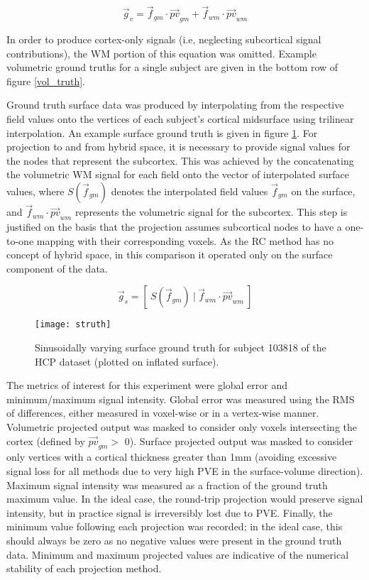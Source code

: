 \begin{equation}
\vec{g}_v = \vec{f}_{gm} \cdot \vec{pv}_{gm} + \vec{f}_{wm} \cdot \vec{pv}_{wm}
\end{equation}

In order to produce cortex-only signals (i.e, neglecting subcortical signal contributions), the WM portion of this equation was omitted. Example volumetric ground truths for a single subject are given in the bottom row of figure \ref{vol_truth}. 

Ground truth surface data was produced by interpolating from the respective field values onto the vertices of each subject's cortical midsurface using trilinear interpolation. An example surface ground truth is given in figure \ref{surf_truth}. For projection to and from hybrid space, it is necessary to provide signal values for the nodes that represent the subcortex. This was achieved by the concatenating the volumetric WM signal for each field onto the vector of interpolated surface values, where $S(\vec{f}_{gm})$ denotes the interpolated field values $\vec{f}_{gm}$ on the surface, and $\vec{f}_{wm} \cdot \vec{pv}_{wm}$ represents the volumetric signal for the subcortex. This step is justified on the basis that the projection assumes subcortical nodes to have a one-to-one mapping with their corresponding voxels. As the RC method has no concept of hybrid space, in this comparison it operated only on the surface component of the data. 

\begin{equation}
\vec{g}_s =  [\ S(\vec{f}_{gm}) \ | \ \vec{f}_{wm} \cdot \vec{pv}_{wm} \  ]
\end{equation}

\begin{figure}
\centering
\texttt{[image: struth]}
\caption{Sinusoidally varying surface ground truth for subject 103818 of the HCP dataset (plotted on inflated surface).}
\label{surf_truth} 
\end{figure}

The metrics of interest for this experiment were global error and minimum/maximum signal intensity. Global error was measured using the RMS of differences, either measured in voxel-wise or in a vertex-wise manner. Volumetric projected output was masked to consider only voxels intersecting the cortex (defined by $\vec{pv}_{gm} >$ 0). Surface projected output was masked to consider only vertices with a cortical thickness greater than 1mm (avoiding excessive signal loss for all methods due to very high PVE in the surface-volume direction). Maximum signal intensity was measured as a fraction of the ground truth maximum value. In the ideal case, the round-trip projection would preserve signal intensity, but in practice signal is irreversibly lost due to PVE. Finally, the minimum value following each projection was recorded; in the ideal case, this should always be zero as no negative values were present in the ground truth data. Minimum and maximum projected values are indicative of the numerical stability of each projection method. 


